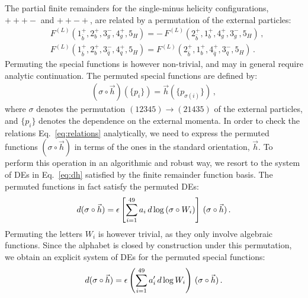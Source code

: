 \documentclass[main.tex]{subfiles}
\begin{document}
The partial finite remainders for the single-minus helicity configurations, $+++-$ and $++-+$, are related by a permutation of the external particles:
\begin{equation} \label{eq:relations}
\begin{aligned} 
 & F^{(L)}(1^+_{\bar{b}},2^+_{b},3^-_g,4^+_g,5_{H}) = - \, F^{(L)}(2^+_{\bar{b}},1^+_{b},4^+_g,3^-_g,5_{H}) \,, \\
 & F^{(L)}(1^+_{\bar{b}},2^+_{b},3^-_{\bar{q}},4^+_q,5_{H}) = F^{(L)}(2^+_{\bar{b}},1^+_{b},4^+_{\bar{q}},3^-_q,5_{H}) \,.
\end{aligned}
\end{equation}
Permuting the special functions is however non-trivial, and may in general require analytic continuation. The permuted special functions are defined by:
\begin{align}
\left(\sigma \circ \vec{h} \right) (\{p_i\}) = \vec{h} ( \{p_{\sigma(i)}\} )\, ,
\end{align}
where $\sigma$ denotes the permutation $(12345)\to(21435)$ of the external particles, and $\{p_i\}$ denotes the dependence on the external momenta. In order to check the relations Eq.~\ref{eq:relations} analytically, we need to express the permuted functions $(\sigma \circ \vec{h} )$ in terms of the ones in the standard orientation, $\vec{h}$. To perform this operation in an algorithmic and robust way, we resort to the system of DEs in Eq.~\ref{eq:dh} satisfied by the finite remainder function basis. The permuted functions in fact satisfy the permuted DEs:
\begin{align}
d ( \sigma \circ \vec{h} ) = \epsilon \left[ \sum_{i=1}^{49} a_i \, d \log\left(\sigma \circ W_i \right) \right] \,  ( \sigma \circ \vec{h} ) \,.
\end{align}
Permuting the letters $W_i$ is however trivial, as they only involve algebraic functions. Since the alphabet is closed by construction under this permutation, we obtain an explicit system of DEs for the permuted special functions:
\begin{align} \label{eq:dsigmah}
d ( \sigma \circ \vec{h} ) = \epsilon \left( \sum_{i=1}^{49} a_i' \, d \log W_i  \right) \,  ( \sigma \circ \vec{h} ) \,.
\end{align}
\end{document}
